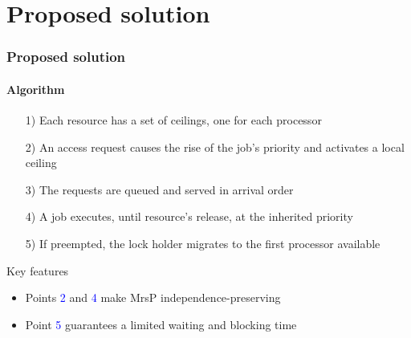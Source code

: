 \section{Proposed solution}

\begin{frame}

	\frametitle{Proposed solution}
	\framesubtitle{Algorithm}

	\begin{enumerate}
		\item [1)] Each resource has a set of ceilings, one for each processor
		\item [2)] An access request causes the rise of the job's priority and activates a local ceiling
		\item [3)] The requests are queued and served in arrival order
		\item [4)] A job executes, until resource's release, at the inherited priority
		\item [5)] If preempted, the lock holder migrates to the first processor available
	\end{enumerate}

	\begin{alertblock}{Key features}
		\begin{itemize}
			\item Points \textcolor{blue}{2} and \textcolor{blue}{4} make MrsP \alert{independence-preserving}
			\item Point \textcolor{blue}{5} guarantees a \alert{limited waiting and blocking time}
		\end{itemize}
	\end{alertblock}

\end{frame}
